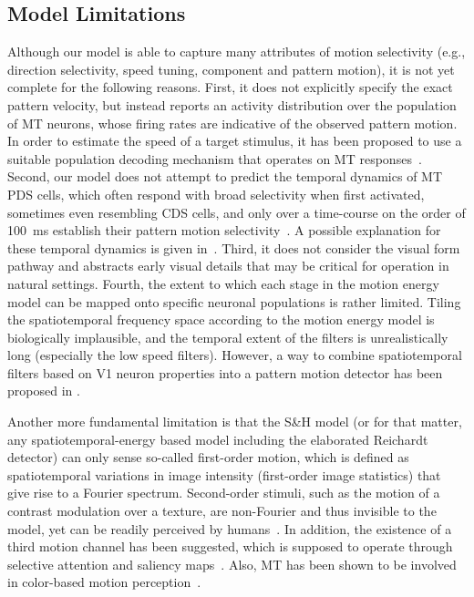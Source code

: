 \subsection{Model Limitations}
\label{sec:MT|disc|limitations}
Although our model is able to capture many attributes of
motion selectivity (e.g., direction selectivity, speed tuning,
component and pattern motion), it is not yet complete for the
following reasons. First, it does not explicitly specify the exact
pattern velocity, but instead reports an activity distribution
over the population of \ac{MT} neurons, whose firing rates are
indicative of the observed pattern motion. In order to estimate
the speed of a target stimulus, it has been proposed to use a
suitable population decoding mechanism that operates on \ac{MT}
responses~\citep{Perrone2012,Hohl2013}. Second, our
model does not attempt to predict the temporal dynamics of
\ac{MT} \ac{PDS} cells, which often respond with broad selectivity
when first activated, sometimes even resembling \ac{CDS} cells,
and only over a time-course on the order of 
\SI{100}{\milli\second} establish
their pattern motion selectivity~\citep{Smith2005}. A possible
explanation for these temporal dynamics is given 
in~\cite{Chey1997}. Third, it does not consider the visual form
pathway and abstracts early visual details that may be critical
for operation in natural settings. Fourth, the extent to which
each stage in the motion energy model can be mapped onto
specific neuronal populations is rather limited. Tiling the
spatiotemporal frequency space according to the motion energy
model is biologically implausible, and the temporal
extent of the filters is unrealistically long (especially the low
speed filters). However, a way to combine spatiotemporal
filters based on \ac{V1} neuron properties into a pattern motion
detector has been proposed in \cite{PerroneThiele2002}.

Another more fundamental limitation is that the S\&H
model (or for that matter, any spatiotemporal-energy based
model including the elaborated Reichardt detector) can only
sense so-called first-order motion, which is defined as spatiotemporal
variations in image intensity (first-order image
statistics) that give rise to a Fourier spectrum. Second-order
stimuli, such as the motion of a contrast modulation over a
texture, are non-Fourier and thus invisible to the model, yet
can be readily perceived by humans~\citep{ChubbSperling1988}.
In addition, the existence of a third motion channel
has been suggested, which is supposed to operate through
selective attention and saliency maps~\citep{LuSperling1995}.
Also, \ac{MT} has been shown to be involved in color-based
motion perception~\citep{Thiele2001}.


